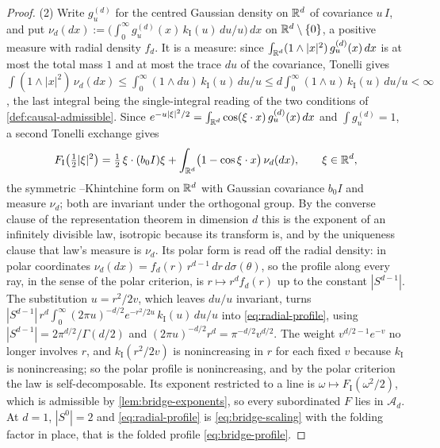 \begin{proof}
(2) Write $g^{(d)}_u$ for the centred Gaussian density on $\mathbb{R}^d$ of covariance $u\,I$, and put
$\nu_d(dx) := \bigl(\int_0^\infty g^{(d)}_u(x)\,k_{\mathrm I}(u)\,du/u\bigr)\,dx$ on
$\mathbb{R}^d \setminus \{0\}$, a positive measure with radial density $f_d$. It is a \Levy{} measure:
since $\int_{\mathbb{R}^d}(1 \wedge |x|^2)\,g^{(d)}_u(x)\,dx$ is at most the total mass $1$ and at most
the trace $du$ of the covariance, Tonelli gives
$\int (1 \wedge |x|^2)\,\nu_d(dx) \le \int_0^\infty (1 \wedge du)\,k_{\mathrm I}(u)\,du/u
 \le d\int_0^\infty (1 \wedge u)\,k_{\mathrm I}(u)\,du/u < \infty$, the last integral being the
single-integral reading of the two conditions of \ref{def:causal-admissible}. Since
$e^{-u|\xi|^2/2} = \int_{\mathbb{R}^d}\cos(\xi\cdot x)\,g^{(d)}_u(x)\,dx$ and $\int g^{(d)}_u = 1$, a second
Tonelli exchange gives
\[
  F_{\mathrm I}\bigl(\tfrac12|\xi|^2\bigr)
   = \tfrac12\,\xi\cdot(b_0 I)\xi
     + \int_{\mathbb{R}^d}\bigl(1 - \cos\xi\cdot x\bigr)\,\nu_d(dx), \qquad \xi \in \mathbb{R}^d,
\]
the symmetric \Levy--Khintchine form on $\mathbb{R}^d$ with Gaussian covariance $b_0 I$ and \Levy{}
measure $\nu_d$; both are invariant under the orthogonal group. By the converse clause of the
representation theorem in dimension $d$ this is the exponent of an infinitely divisible law,
isotropic because its transform is, and by the uniqueness clause that law's \Levy{} measure is
$\nu_d$. Its polar form is read off the radial density: in polar coordinates
$\nu_d(dx) = f_d(r)\,r^{d-1}\,dr\,d\sigma(\theta)$, so the profile along every ray, in the
sense of the polar criterion, is $r \mapsto r^d f_d(r)$ up to the constant $|S^{d-1}|$. The
substitution $u = r^2/2v$, which leaves $du/u$ invariant, turns
$|S^{d-1}|\,r^d\int_0^\infty (2\pi u)^{-d/2}e^{-r^2/2u}\,k_{\mathrm I}(u)\,du/u$ into
\ref{eq:radial-profile}, using $|S^{d-1}| = 2\pi^{d/2}/\Gamma(d/2)$ and
$(2\pi u)^{-d/2}r^d = \pi^{-d/2}v^{d/2}$. The weight $v^{d/2-1}e^{-v}$ no longer involves $r$,
and $k_{\mathrm I}(r^2/2v)$ is nonincreasing in $r$ for each fixed $v$ because $k_{\mathrm I}$ is
nonincreasing; so the polar profile is nonincreasing, and by the polar criterion the law is
self-decomposable. Its exponent restricted to a line is $\omega \mapsto F_{\mathrm I}(\omega^2/2)$,
which is admissible by \ref{lem:bridge-exponents}, so every subordinated $F$ lies in
$\mathcal{A}_d$. At $d = 1$, $|S^0| = 2$ and \ref{eq:radial-profile} is \ref{eq:bridge-scaling}
with the folding factor in place, that is the folded profile \ref{eq:bridge-profile}.


\end{proof}
